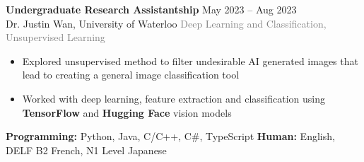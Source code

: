 \documentclass[9pt]{developercv} %
\begin{document}

\begin{minipage}[t]{\textwidth}
	\vspace{-\baselineskip}
	\textbf{Undergraduate Research Assistantship} \hfill May 2023 -- Aug 2023\\
	Dr. Justin Wan, \; University of Waterloo \hfill \textcolor{gray}{Deep Learning and Classification, Unsupervised Learning}
	\begin{itemize}[noitemsep,topsep=0pt]
		\item Explored unsupervised method to filter undesirable AI generated images that lead to creating a general image classification tool
		\item Worked with deep learning, feature extraction and classification using \textbf{TensorFlow} and \textbf{Hugging Face} vision models
	\end{itemize}
\end{minipage}


\begin{minipage}[t]{\textwidth}
	\vspace{-\baselineskip}
	\textbf{Programming:} Python, Java, C/C++, C\#, TypeScript
	\hfill
	\textbf{Human:} English, DELF B2 French, N1 Level Japanese
\end{minipage}


\end{document}
